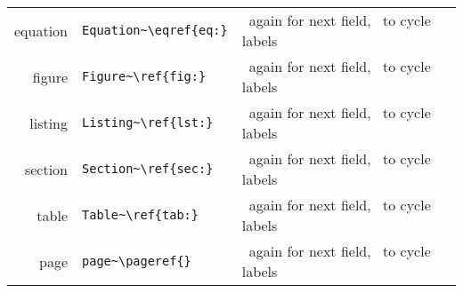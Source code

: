 \documentclass[10pt]{article}
\begin{document}
\begin{table}
\begin{tabular}{r|l|l}
	\hline

	equation\tabkey        & \verb!Equation~\eqref{eq:}!     & \tabkey~again for next field, \esckey~to cycle labels        \\
	figure\tabkey          & \verb!Figure~\ref{fig:}!        & \tabkey~again for next field, \esckey~to cycle labels       \\
	listing\tabkey         & \verb!Listing~\ref{lst:}!       & \tabkey~again for next field, \esckey~to cycle labels       \\
	section\tabkey         & \verb!Section~\ref{sec:}!       & \tabkey~again for next field, \esckey~to cycle labels       \\
	table\tabkey           & \verb!Table~\ref{tab:}!         & \tabkey~again for next field, \esckey~to cycle labels       \\
	page\tabkey            & \verb!page~\pageref{}!          & \tabkey~again for next field, \esckey~to cycle labels       \\

	\hline


\end{tabular}
\end{table}
\end{document}
